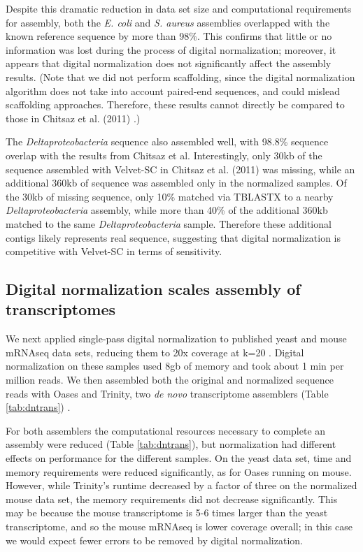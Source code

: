 Despite this dramatic reduction in data set size and computational
requirements for assembly, both the {\em E. coli} and {\em S. aureus}
assemblies overlapped with the known reference sequence by more than
98\%.  This confirms that little or no information was lost during
the process of digital normalization; moreover, it appears that
digital normalization does not significantly affect the assembly results.
(Note that we did not perform scaffolding, since the digital
normalization algorithm does not take into account paired-end
sequences, and could mislead scaffolding approaches.  Therefore, these
results cannot directly be compared to those in Chitsaz et al. (2011)
\cite{pubmed21926975}.)

The {\em Deltaproteobacteria} sequence also assembled well, with
98.8\% sequence overlap with the results from Chitsaz et al.
Interestingly, only 30kb of the sequence assembled with Velvet-SC in
Chitsaz et al. (2011) was missing, while an additional 360kb of
sequence was assembled only in the normalized samples.  Of the 30kb of
missing sequence, only 10\% matched via TBLASTX to a nearby {\em
  Deltaproteobacteria} assembly, while more than 40\% of the
additional 360kb matched to the same {\em Deltaproteobacteria} sample.
Therefore these additional contigs likely represents real
sequence, suggesting that digital normalization is competitive with
Velvet-SC in terms of sensitivity.



\subsection{Digital normalization scales assembly of transcriptomes}

We next applied single-pass digital normalization to published yeast
and mouse mRNAseq data sets, reducing them to 20x coverage at k=20
\cite{pubmed21572440}.  Digital normalization on these samples used
8gb of memory and took about 1 min per million reads.  We then
assembled both the original and normalized sequence reads with Oases
and Trinity, two {\em de novo} transcriptome assemblers (Table
\ref{tab:dntrans}) \cite{pubmed22368243,pubmed21572440}.

For both assemblers the computational resources necessary to complete
an assembly were reduced (Table \ref{tab:dntrans}), but normalization
had different effects on performance for the different samples.  On the
yeast data set, time and memory requirements were reduced
significantly, as for Oases running on mouse.  However, while
Trinity's runtime decreased by a factor of three on the normalized
mouse data set, the memory requirements did not decrease
significantly.  This may be because the mouse transcriptome is 5-6
times larger than the yeast transcriptome, and so the mouse mRNAseq
is lower coverage overall; in this case we would expect fewer
errors to be removed by digital normalization.

